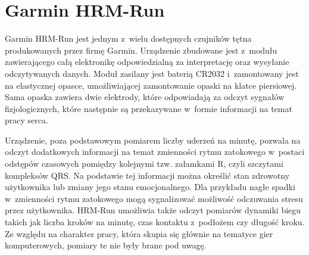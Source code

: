 \section{Garmin HRM-Run}
Garmin HRM-Run jest jednym z~wielu dostępnych czujników tętna produkowanych przez firmę Garmin. Urządzenie zbudowane jest z~modułu zawierającego całą elektronikę odpowiedzialną za interpretację oraz wysyłanie odczytywanych danych. Moduł zasilany jest baterią CR2032 i~zamontowany jest na elastycznej opasce, umożliwiającej zamontowanie opaski na klatce piersiowej. Sama opaska zawiera dwie elektrody, które odpowiadają za odczyt sygnałów fizjologicznych, które następnie są przekazywane w~formie informacji na temat pracy serca. 

Urządzenie, poza podstawowym pomiarem liczby uderzeń na minutę, pozwala na odczyt dodatkowych informacji na temat zmienności rytmu zatokowego w~postaci odstępów czasowych pomiędzy kolejnymi tzw. załamkami R, czyli szczytami kompleksów QRS. Na podstawie tej informacji można określić stan zdrowotny użytkownika lub zmiany jego stanu emocjonalnego. Dla przykładu nagłe spadki w~zmienności rytmu zatokowego mogą sygnalizować możliwość odczuwania stresu przez użytkownika. HRM-Run umożliwia także odczyt pomiarów dynamiki biegu takich jak liczba kroków na minutę, czas kontaktu z~podłożem czy długość kroku. Ze względu na charakter pracy, która skupia się głównie na tematyce gier komputerowych, pomiary te nie były brane pod uwagę. 

